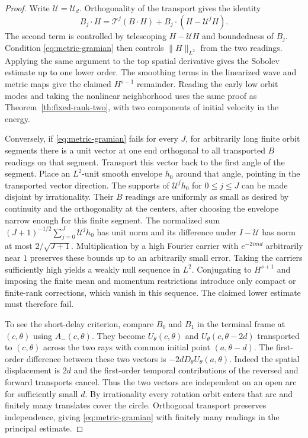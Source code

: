 \begin{proof}
Write $\mathcal U=\mathcal U_d$.
Orthogonality of the transport gives the identity
\[
 B_j\cdot H
    =\mathcal T^j(B\cdot H)
         +B_j\cdot(H-\mathcal U^j H).
\]
The second term is controlled by telescoping
$H-\mathcal U H$ and boundedness of $B_j$.
Condition \eqref{eq:metric-gramian} then controls
$\|H\|_{L^2}$ from the two readings.
Applying the same argument to the top spatial
derivative gives the Sobolev estimate up to
one lower order. The smoothing terms in the
linearized wave and metric maps give the
claimed $H^{s-1}$ remainder.
Reading the early low orbit modes and taking
the nonlinear neighborhood
uses the same proof as
Theorem~\ref{th:fixed-rank-two}, with two
components of initial velocity in the energy.

Conversely, if \eqref{eq:metric-gramian}
fails for every $J$, for arbitrarily long finite
orbit segments there is a unit vector at one end
orthogonal to all transported $B$ readings on
that segment. Transport this vector back to the
first angle of the segment. Place an $L^2$-unit
smooth envelope $h_0$ around that angle, pointing
in the transported vector direction. The supports
of $\mathcal U^j h_0$ for $0\le j\le J$ can be
made disjoint by irrationality.
Their $B$ readings are uniformly as small as
desired by continuity and the orthogonality at
the centers, after choosing the envelope narrow
enough for this finite segment.
The normalized sum
$(J+1)^{-1/2}\sum_{j=0}^J\mathcal U^j h_0$
has unit norm and its difference under $I-\mathcal U$
has norm at most $2/\sqrt{J+1}$.
Multiplication by a high Fourier carrier with
$e^{-2imd}$ arbitrarily near $1$ preserves these
bounds up to an arbitrarily small error.
Taking the carriers sufficiently high yields a
weakly null sequence in $L^2$.
Conjugating to $H^{s+1}$ and imposing the
finite mean and momentum restrictions introduce
only compact or finite-rank corrections, which
vanish in this sequence. The claimed lower
estimate must therefore fail.

To see the short-delay criterion, compare
$B_0$ and $B_1$ in the terminal frame at
$(c,\theta)$ using $A_-(c,\theta)$.
They become $U_\theta(c,\theta)$ and
$U_\theta(c,\theta-2d)$ transported to $(c,\theta)$
across the two rays with common initial point
$(a,\theta-d)$. The first-order difference between
these two vectors is $-2dD_\theta U_\theta(a,\theta)$.
Indeed the spatial displacement is $2d$ and the
first-order temporal contributions of the reversed
and forward transports cancel. Thus the two
vectors are independent on an open arc for
sufficiently small $d$. By irrationality every
rotation orbit enters that arc and finitely many
translates cover the circle. Orthogonal transport
preserves independence, giving
\eqref{eq:metric-gramian} with finitely many
readings in the principal estimate.
\end{proof}

